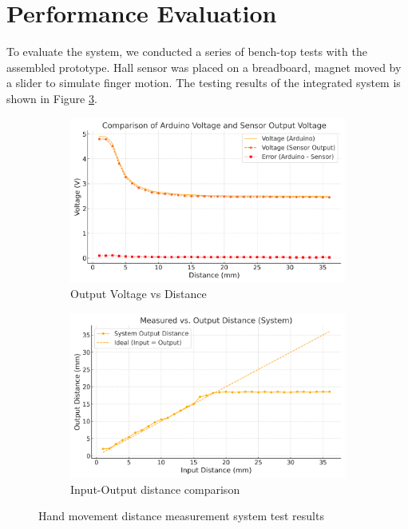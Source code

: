 \documentclass[a4paper,12pt]{article}
\begin{document}
%
\section{Performance Evaluation}
To evaluate the system, we conducted a series of bench-top tests with the assembled prototype. Hall sensor was placed on a breadboard, magnet moved by a slider to simulate finger motion. The testing results of the integrated system is shown in Figure \ref{fig:testres}. 
\begin{figure}[h]
\centering
\begin{subfigure}{0.5\textwidth}
  \centering
  \includegraphics[width=\linewidth]{distvsvoltX2.png}
  \caption{Output Voltage vs Distance}
  \label{fig:voltdist}
\end{subfigure}\hfill
\begin{subfigure}{0.5\textwidth}
  \centering
  \includegraphics[width=\linewidth]{iodist.png}
  \caption{Input-Output distance comparison}
  \label{fig:distdit}
\end{subfigure}
\caption{Hand movement distance measurement system test results}
\label{fig:testres}
\end{figure}
\end{document}
